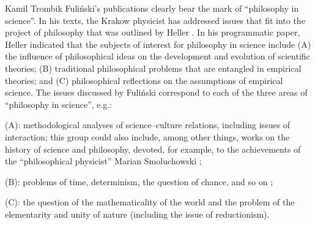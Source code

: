 \begin{artengenv}{Kamil Trombik}
Fuliński's publications clearly bear the mark of ``philosophy in science''. In his texts, the Krakow physicist has addressed issues that fit into the project of philosophy that was outlined by Heller 
\parencites*[][]{heller_jak_1986}[English translation:][]{heller_how_2019}. %
 In his programmatic paper, Heller indicated that the subjects of interest for philosophy in science include (A) the influence of philosophical ideas on the development and evolution of scientific theories; (B) traditional philosophical problems that are entangled in empirical theories; and (C) philosophical reflections on the assumptions of empirical science. The issues discussed by Fuliński correspond to each of the three areas of ``philosophy in science'', e.g.:



(A): methodological analyses of science–culture relations, including issues of interaction; this group could also include, among other things, works on the history of science and philosophy, devoted, for example, to the achievements of the ``philosophical physicist'' Marian Smoluchowski 
\parencite[e.g][]{fulinski_fluktuujacy_2017};%




(B): problems of time, determinism, the question of chance, and so on 
\parencites[e.g.][]{fulinski_o_1993}[][]{fulinski_profesor_2015};%




(C): the question of the mathematicality of the world and the problem of the elementarity and unity of nature (including the issue of reductionism).




\end{artengenv}
